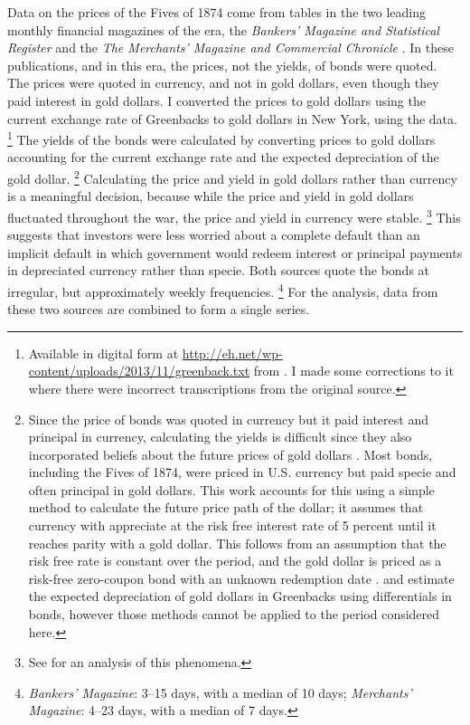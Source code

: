 Data on the prices of the Fives of 1874 come from tables in the two leading monthly financial magazines of the era, the \textit{Bankers' Magazine and Statistical Register} and the \textit{The Merchants' Magazine and Commercial Chronicle} \parencites[186]{Mitchell1903}.
In these publications, and in this era, the prices, not the yields, of bonds were quoted.
The prices were quoted in currency, and not in gold dollars, even though they paid interest in gold dollars.
I converted the prices to gold dollars using the current exchange rate of Greenbacks to gold dollars in New York, using the \textcite{Mitchell1908} data.%
\footnote{
  Available in digital form at \url{http://eh.net/wp-content/uploads/2013/11/greenback.txt} from \textcite{WillardGuinnaneEtAl1996}.
  I made some corrections to it where there were incorrect transcriptions from the original source.
}
The yields of the bonds were calculated by converting prices to gold dollars accounting for the current exchange rate and the expected depreciation of the gold dollar.%
\footnote{
  Since the price of bonds was quoted in currency but it paid interest and principal in currency, calculating the yields is difficult since they also incorporated beliefs about the future prices of gold dollars \parencites[Appendix A]{Macaulay1938}{Roll1972}{Calomiris1988}[302-303]{HomerSylla2005}.
  Most bonds, including the Fives of 1874, were priced in U.S. currency but paid specie and often principal in gold dollars.
  This work accounts for this using a simple method to calculate the future price path of the dollar; it assumes that currency with appreciate at the risk free interest rate of 5 percent until it reaches parity with a gold dollar.
  This follows from an assumption that the risk free rate is constant over the period, and the gold dollar is priced as a risk-free zero-coupon bond with an unknown redemption date \cite{McCandless1996}.
  \textcite{Roll1972} and \textcite{Calomiris1988} estimate the expected depreciation of gold dollars in Greenbacks using differentials in bonds, however those methods cannot be applied to the period considered here.
}
Calculating the price and yield in gold dollars rather than currency is a meaningful decision, because while the price and yield in gold dollars fluctuated throughout the war, the price and yield in currency were stable.%
\footnote{See \textcite{Roll1972} for an analysis of this phenomena.}
This suggests that investors were less worried about a complete default than an implicit default in which government would redeem interest or principal payments in depreciated currency rather than specie.
Both sources quote the bonds at irregular, but approximately weekly frequencies.
\footnote{\textit{Bankers' Magazine}: 3--15 days, with a median of 10 days; \textit{Merchants' Magazine}: 4--23 days, with a median of 7 days.}
For the analysis, data from these two sources are combined to form a single series.

